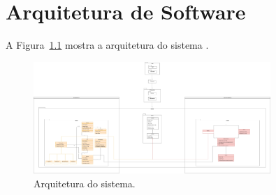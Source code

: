 
\chapter{Arquitetura de Software}
\label{sec-arquitetura}
\vspace{-1cm}

A Figura~\ref{figura-arquitetura} mostra a arquitetura do sistema \emph{\imprimirtitulo}.

\begin{figure}[h]
	\centering
	\includegraphics[width=0.8\textwidth]{figuras/figura-arquitetura}
	\caption{Arquitetura do sistema.}
	\label{figura-arquitetura}
\end{figure}

\vspace{0.5cm}

